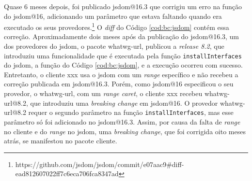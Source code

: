 Quase 6 meses depois, foi publicado \textsf{jsdom@16.3} que corrigiu um erro na função do \textsf{jsdom@16}, adicionando um parâmetro que estava faltando quando era executado os seus provedores.\footnote{https://github.com/jsdom/jsdom/commit/e07aac9\#diff-ead812607022ff7c6eca706fca8347ad} O \textit{diff} do Código \ref{cod:bc:jsdom} contém essa correção. Aproximadamente dois meses após da publicação do \textsf{jsdom@16.3}, um dos provedores do \textsf{jsdom}, o pacote \textsf{whatwg-url}, publicou a \textit{release 8.2}, que introduziu uma funcionalidade que é executada pela função \texttt{installInterfaces} do \textsf{jsdom}, a função do Código \ref{cod:bc:jsdom}, e a execução ocorreu com sucesso. Entretanto, o cliente \textsf{xxx} usa o \textsf{jsdom} com um \textit{range} específico e não recebeu a correção publicada em \textsf{jsdom@16.3}. Porém, como \textsf{jsdom@16} especificou o seu provedor, o \textsf{whatwg-url}, com um \textit{range caret}, o cliente \textsf{xxx} recebeu \textsf{whatwg-url@8.2}, que introduziu uma \textit{breaking change} em \textsf{jsdom@16}. O provedor \textsf{whatwg-url@8.2} requer o segundo parâmetro na função \texttt{installInterfaces}, mas esse parâmetro só foi adicionado no \textsf{jsdom@16.3}. Assim, por causa da falta de \textit{range} no cliente e do \textit{range} no \textsf{jsdom}, uma \textit{breaking change}, que foi corrigida oito meses atrás, se manifestou no pacote cliente.